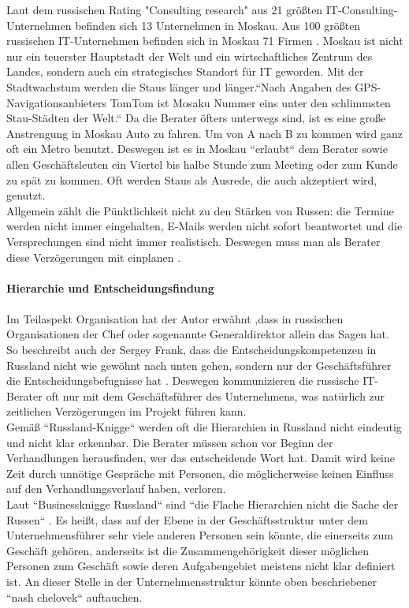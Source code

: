 	 Laut dem russischen Rating "Consulting research" aus 21 größten IT-Consulting-Unternehmen befinden sich 13 Unternehmen in Moskau\cite{RaitConsRU}.
	 Aus 100 größten russischen IT-Unternehmen befinden sich in Moskau 71 Firmen \cite{100BigITConsURU}. 
	 Moskau ist nicht nur ein teuerster Hauptstadt der Welt und ein wirtschaftliches Zentrum des Landes, sondern auch ein strategisches Standort für IT geworden.
	 Mit der Stadtwachstum werden die Staus länger und länger.``Nach Angaben des GPS-Navigationsanbieters TomTom ist Mosaku Nummer eins unter den schlimmsten Stau-Städten der Welt\cite{MoskauStau1}.``
	 Da die Berater öfters unterwegs sind, ist es eine große Anstrengung in Moskau Auto zu fahren. Um von A nach B zu kommen wird ganz oft ein Metro benutzt. 
	 Deswegen ist es in Moskau ``erlaubt`` dem Berater sowie allen Geschäftsleuten ein Viertel bis halbe Stunde zum Meeting oder zum  Kunde zu spät zu kommen. Oft werden Staus als Ausrede, die auch akzeptiert wird, genutzt.\\
	 Allgemein zählt die Pünktlichkeit nicht zu den Stärken von Russen: die Termine werden nicht immer eingehalten, E-Mails werden nicht sofort beantwortet und die Versprechungen sind nicht immer realistisch. Deswegen muss man als Berater diese Verzögerungen mit einplanen \cite{RusKnigge}.\\ \\
	 	 \textbf{Hierarchie und Entscheidungsfindung}\\
	 	 \\
	 Im Teilaspekt Organisation hat der Autor erwähnt ,dass in russischen Organisationen der Chef oder sogenannte Generaldirektor  allein das Sagen hat. So beschreibt auch der Sergey Frank, dass die Entscheidungskompetenzen in Russland nicht wie gewöhnt nach unten gehen, sondern nur der Geschäftsführer die Entscheidungsbefugnisse hat \cite{RuSFI}.
	 Deswegen kommunizieren die russische IT-Berater oft nur mit dem Geschäftsführer des Unternehmens, was natürlich zur zeitlichen Verzögerungen im Projekt führen kann.\\
	 Gemäß ``Russland-Knigge`` \cite{RusKnigge} werden oft die Hierarchien in Russland nicht eindeutig und nicht klar erkennbar. Die Berater müssen schon vor Beginn der Verhandlungen herausfinden, wer das entscheidende Wort hat. Damit wird keine Zeit durch unnötige Gespräche mit Personen, die möglicherweise keinen Einfluss auf den Verhandlungsverlauf haben, verloren.\\
	 Laut ``Businessknigge Russland`` sind ``die Flache Hierarchien nicht die Sache der Russen`` \cite{RusKnigge}. Es heißt, dass auf der Ebene in der Geschäftsstruktur unter dem Unternehmensführer  sehr viele anderen Personen sein könnte, die einerseits zum Geschäft gehören, anderseits ist die Zusammengehörigkeit dieser möglichen Personen zum Geschäft sowie deren Aufgabengebiet meistens nicht klar definiert ist. An dieser Stelle in der Unternehmensstruktur könnte oben beschriebener ``nash chelovek`` auftauchen.
	
